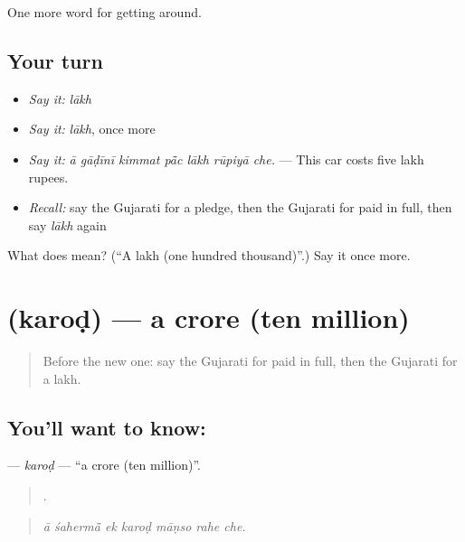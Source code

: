 \begin{grammarlens}[title={What you've built}]
One more word for getting around.
\end{grammarlens}

\subsection*{Your turn}
\begin{itemize}
\raggedright
  \item \emph{Say it:} \emph{lākh}
  \item \emph{Say it:} \emph{lākh}, once more
  \item \emph{Say it:} \emph{ā gāḍīnī kimmat pā̃c lākh rūpiyā che.} — This car costs five lakh rupees.
  \item \emph{Recall:} say the Gujarati for a pledge, then the Gujarati for paid in full, then say \emph{lākh} again
\end{itemize}

\begin{tcolorbox}[breakable,colback=teal!4,colframe=teal!35!black,title={Before you move on}]
What does  mean? (\textquotedblleft{}A lakh (one hundred thousand)\textquotedblright{}.) Say it once more.
\end{tcolorbox}
\section[\texorpdfstring{\gu{કરોડ} (karoḍ)}{કરોડ (karoḍ)}]{ (karoḍ) — a crore (ten million)}

\label{lesson:GU-C426-karod}



\begin{quote}
Before the new one: say the Gujarati for paid in full, then the Gujarati for a lakh.
\end{quote}

\subsection*{You'll want to know: }
\textbf{} — \emph{karoḍ} — \textquotedblleft{}a crore (ten million)\textquotedblright{}.

\begin{quote}
      .
\end{quote}

\begin{quote}
\emph{ā śahermā̃ ek karoḍ māṇso rahe che.}
\end{quote}

